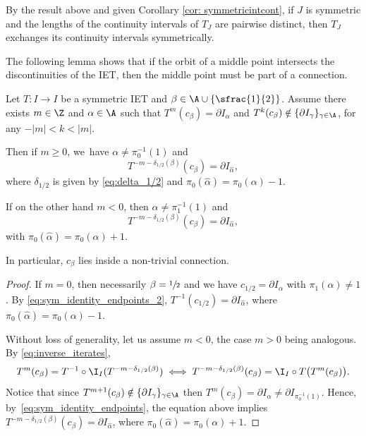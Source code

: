 By the result above and given Corollary \ref{cor: symmetricintcont}, if $J$ is symmetric and the lengths of the continuity intervals of $T_J$ are pairwise distinct, then $T_J$ exchanges its continuity intervals symmetrically.

The following lemma shows that if the orbit of a middle point intersects the discontinuities of the IET, then the middle point must be part of a connection.

\begin{lemma}
\label{lem:symmetric_connection}
Let $T: I \to I$ be a symmetric IET and $\beta \in \A \cup \{\sfrac{1}{2}\}$. Assume there exists $m \in \Z$ and $\alpha \in \A$ such that $T^m(c_\beta) = \partial I_\alpha$ and $T^k(c_\beta) \notin \{\partial I_\gamma\}_{\gamma \in \A}$, for any $-|m| < k < |m|$.

Then {if $m\ge 0$}, we~have $\alpha \neq \pi_0^{-1}(1)$ and\vspace*{-3pt}
\[
T^{-m - \delta_{1/2}(\beta)}(c_\beta) = \partial I_{\hat \alpha},
\]
where $\delta_{1/2}$ is given by \eqref{eq:delta_1/2} and $\pi_0( \hat \alpha) = \pi_0(\alpha) - 1$.

{If on the other hand $m<0$, then $\alpha\neq \pi_1^{-1}(1)$ and\vspace*{-3pt}
\[
T^{-m - \delta_{1/2}(\beta)}(c_\beta) = \partial I_{\hat \alpha},
\]
with $\pi_0( \hat \alpha) = \pi_0(\alpha) + 1$.
}

In particular, $c_\beta$ lies inside a non-trivial connection.
\end{lemma}

\begin{proof}

If $m = 0$, then necessarily $\beta = \sfrac{1}{2}$ and we have $c_{1/2} = \partial I_\alpha$ with $\pi_1(\alpha) \neq 1$. By \eqref{eq:sym_identity_endpoints_2}, $T^{-1}(c_{1/2}) = \partial I_{\hat \alpha}$, where $\pi_0( \hat \alpha) = \pi_0(\alpha) - 1$.

Without loss of generality, let us assume $m < 0$, the case $m > 0$ being analogous. By \eqref{eq:inverse_iterates},
\begin{equation*}
\label{eq:inverse_iterates_negative}
T^m(c_{\beta})=T^{-1}\circ \I_I(T^{-m-\delta_{1/2}(\beta)})\iff T^{-m- \delta_{1/2}(\beta) }(c_\beta) = \I_I\circ T \big( T^{m}(c_\beta)\big).
\end{equation*}
Notice that since $T^{m + 1}(c_\beta) \notin \{\partial I_\gamma\}_{\gamma \in \A}$ then $T^{m}(c_\beta) = \partial I_\alpha \neq \partial I_{\pi_0^{-1}(1)}$. Hence, by~\eqref{eq:sym_identity_endpoints}, the equation above implies $T^{-m - \delta_{1/2}(\beta)}(c_\beta) = \partial I_{\hat \alpha}$, where \hbox{$\pi_0( \hat \alpha) = \pi_0(\alpha) + 1$}.
\end{proof}

